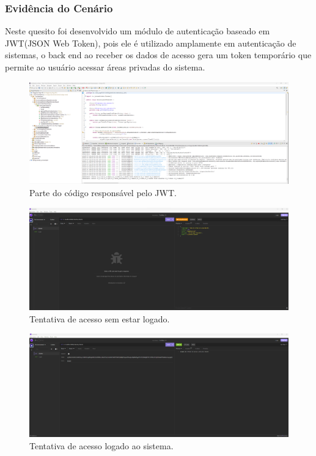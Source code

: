\subsubsection{Evidência do Cenário \avcen} 

Neste quesito foi desenvolvido um módulo de autenticação baseado em JWT(JSON Web Token), pois ele é utilizado amplamente 
em autenticação de sistemas, o back end ao receber os dados de acesso gera um token temporário que permite ao usuário acessar 
áreas privadas do sistema.

\begin{figure}[ht]
    \centering
    \includegraphics[width=1\textwidth]{codigo_fonte_jwt.png}
    \caption{Parte do código responsável pelo JWT.}
    \label{fig:Parte do código responsável pelo JWT.}
 \end{figure}

\begin{figure}[ht]
    \centering
    \includegraphics[width=1\textwidth]{acesso_sem_token.png}
    \caption{Tentativa de acesso sem estar logado.}
    \label{fig:Tentativa de acesso sem estar logado.}
 \end{figure}

 \begin{figure}[ht]
    \centering
    \includegraphics[width=1\textwidth]{acesso_com_token.png}
    \caption{Tentativa de acesso logado ao sistema.}
    \label{fig:Tentativa de acesso logao ao sistema.}
 \end{figure}



